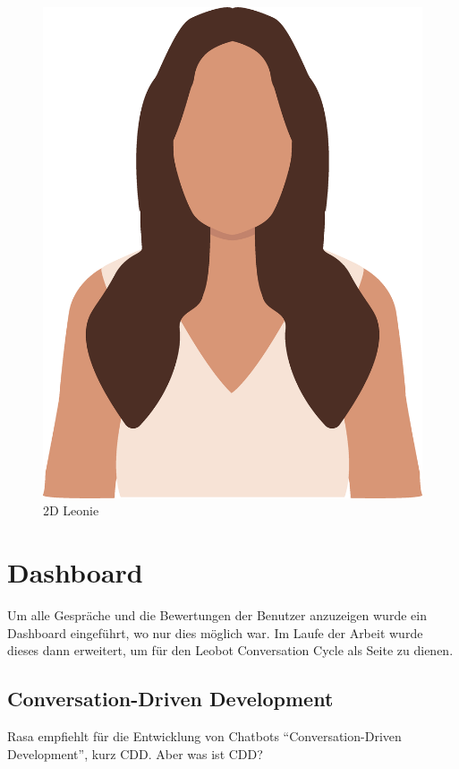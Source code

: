 \begin{figure}[hbt!]
    \centering
    \includegraphics[scale=0.3]{pics/LeonieTrans}
    \caption{2D Leonie}
    \label{fig:impl:leonieTrans}
\end{figure}

\section{Dashboard}\label{sec:dashboard}

Um alle Gespräche und die Bewertungen der Benutzer anzuzeigen wurde ein Dashboard eingeführt, wo nur dies möglich war.
Im Laufe der Arbeit wurde dieses dann erweitert, um für den Leobot Conversation Cycle als Seite zu dienen.

\subsection{Conversation-Driven Development}\label{cdd}
Rasa empfiehlt für die Entwicklung von Chatbots ``Conversation-Driven Development'', kurz CDD.\cite{cdd}
Aber was ist CDD?

